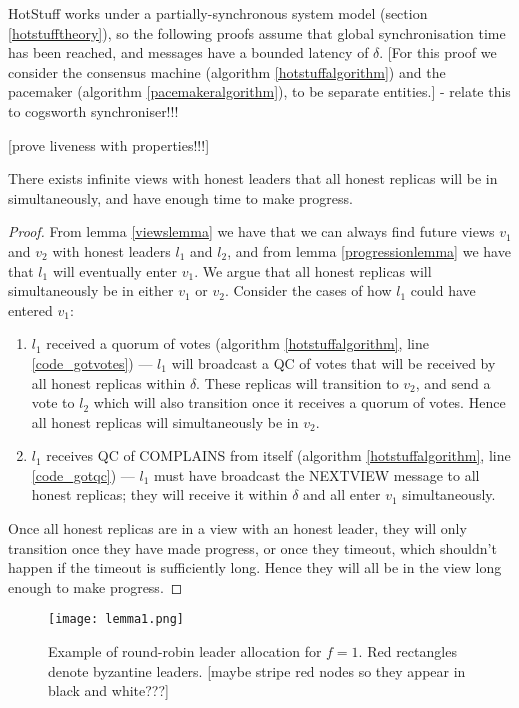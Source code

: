 HotStuff works under a partially-synchronous system model (section \ref{hotstufftheory}), so the following proofs assume that global synchronisation time has been reached, and messages have a bounded latency of $\delta$.
[For this proof we consider the consensus machine (algorithm \ref{hotstuffalgorithm}) and the pacemaker (algorithm \ref{pacemakeralgorithm}), to be separate entities.] - relate this to cogsworth synchroniser!!!

[prove liveness with properties!!!]

\begin{theorem} \label{viewsync}
	There exists infinite views with honest leaders that all honest replicas will be in simultaneously, and have enough time to make progress.
\end{theorem}

\begin{proof}
	From lemma \ref{viewslemma} we have that we can always find future views $v_1$ and $v_2$ with honest leaders $l_1$ and $l_2$, and from lemma \ref{progressionlemma} we have that $l_1$ will eventually enter $v_1$. We argue that all honest replicas will simultaneously be in either $v_1$ or $v_2$. Consider the cases of how $l_1$ could have entered $v_1$:
	\begin{enumerate}
		\item $l_1$ received a quorum of votes (algorithm \ref{hotstuffalgorithm}, line \ref{code_gotvotes}) --- $l_1$ will broadcast a QC of votes that will be received by all honest replicas within $\delta$. These replicas will transition to $v_2$, and send a vote to $l_2$ which will also transition once it receives a quorum of votes. Hence all honest replicas will simultaneously be in $v_2$.
		\item $l_1$ receives QC of COMPLAINS from itself (algorithm \ref{hotstuffalgorithm}, line \ref{code_gotqc}) --- $l_1$ must have broadcast the NEXT{\large V}IEW message to all honest replicas; they will receive it within $\delta$ and all enter $v_1$ simultaneously.
	\end{enumerate}
	Once all honest replicas are in a view with an honest leader, they will only transition once they have made progress, or once they timeout, which shouldn't happen if the timeout is sufficiently long. Hence they will all be in the view long enough to make progress.
\end{proof}

\begin{figure}[h!]
	\centering
	\texttt{[image: lemma1.png]}
	\caption{Example of round-robin leader allocation for $f = 1$. Red rectangles denote byzantine leaders. [maybe stripe red nodes so they appear in black and white???]}
	\label{lemma1diagram}
\end{figure}

